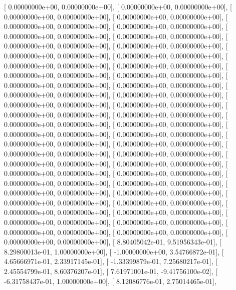 \documentclass{article}
\begin{document}
       [  0.00000000e+00,   0.00000000e+00],
       [  0.00000000e+00,   0.00000000e+00],
       [  0.00000000e+00,   0.00000000e+00],
       [  0.00000000e+00,   0.00000000e+00],
       [  0.00000000e+00,   0.00000000e+00],
       [  0.00000000e+00,   0.00000000e+00],
       [  0.00000000e+00,   0.00000000e+00],
       [  0.00000000e+00,   0.00000000e+00],
       [  0.00000000e+00,   0.00000000e+00],
       [  0.00000000e+00,   0.00000000e+00],
       [  0.00000000e+00,   0.00000000e+00],
       [  0.00000000e+00,   0.00000000e+00],
       [  0.00000000e+00,   0.00000000e+00],
       [  0.00000000e+00,   0.00000000e+00],
       [  0.00000000e+00,   0.00000000e+00],
       [  0.00000000e+00,   0.00000000e+00],
       [  0.00000000e+00,   0.00000000e+00],
       [  0.00000000e+00,   0.00000000e+00],
       [  0.00000000e+00,   0.00000000e+00],
       [  0.00000000e+00,   0.00000000e+00],
       [  0.00000000e+00,   0.00000000e+00],
       [  0.00000000e+00,   0.00000000e+00],
       [  0.00000000e+00,   0.00000000e+00],
       [  0.00000000e+00,   0.00000000e+00],
       [  0.00000000e+00,   0.00000000e+00],
       [  0.00000000e+00,   0.00000000e+00],
       [  0.00000000e+00,   0.00000000e+00],
       [  0.00000000e+00,   0.00000000e+00],
       [  0.00000000e+00,   0.00000000e+00],
       [  0.00000000e+00,   0.00000000e+00],
       [  0.00000000e+00,   0.00000000e+00],
       [  0.00000000e+00,   0.00000000e+00],
       [  0.00000000e+00,   0.00000000e+00],
       [  0.00000000e+00,   0.00000000e+00],
       [  0.00000000e+00,   0.00000000e+00],
       [  0.00000000e+00,   0.00000000e+00],
       [  0.00000000e+00,   0.00000000e+00],
       [  0.00000000e+00,   0.00000000e+00],
       [  0.00000000e+00,   0.00000000e+00],
       [  0.00000000e+00,   0.00000000e+00],
       [  0.00000000e+00,   0.00000000e+00],
       [  0.00000000e+00,   0.00000000e+00],
       [  0.00000000e+00,   0.00000000e+00],
       [  0.00000000e+00,   0.00000000e+00],
       [  0.00000000e+00,   0.00000000e+00],
       [  0.00000000e+00,   0.00000000e+00],
       [  0.00000000e+00,   0.00000000e+00],
       [  0.00000000e+00,   0.00000000e+00],
       [  0.00000000e+00,   0.00000000e+00],
       [  8.80405042e-01,   9.51956343e-01],
       [  8.29800013e-01,   1.00000000e+00],
       [ -1.00000000e+00,   3.54766872e-01],
       [  4.65666971e-01,   2.33917145e-01],
       [ -1.33399879e-01,   7.25680217e-01],
       [  2.45554799e-01,   8.60376207e-01],
       [  7.61971001e-01,  -9.41756100e-02],
       [ -6.31758437e-01,   1.00000000e+00],
       [  8.12086776e-01,   2.75014465e-01],
\end{document}
